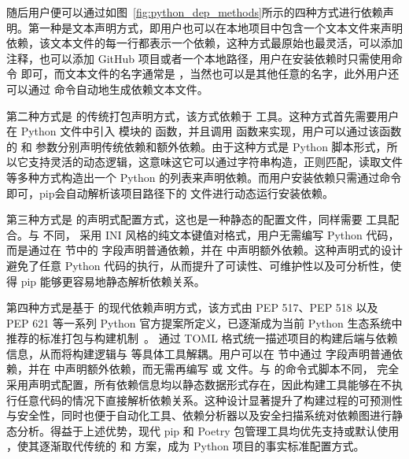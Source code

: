随后用户便可以通过如图~\ref{fig:python_dep_methods}所示的四种方式进行依赖声明。第一种是文本声明方式，即用户也可以在本地项目中包含一个文本文件来声明依赖，该文本文件的每一行都表示一个依赖，这种方式最原始也最灵活，可以添加注释，也可以添加 GitHub 项目或者一个本地路径，用户在安装依赖时只需使用命令  即可，而文本文件的名字通常是 ，当然也可以是其他任意的名字，此外用户还可以通过  命令自动地生成依赖文本文件。

第二种方式是  的传统打包声明方式，该方式依赖于  工具。这种方式首先需要用户在 Python 文件中引入  模块的  函数，并且调用  函数来实现，用户可以通过该函数的  和  参数分别声明传统依赖和额外依赖。由于这种方式是 Python 脚本形式，所以它支持灵活的动态逻辑，这意味这它可以通过字符串构造，正则匹配，读取文件等多种方式构造出一个 Python 的列表来声明依赖。而用户安装依赖只需通过命令  即可，pip会自动解析该项目路径下的  文件进行动态运行安装依赖。

第三种方式是  的声明式配置方式，这也是一种静态的配置文件，同样需要  工具配合。与  不同， 采用 INI 风格的纯文本键值对格式，用户无需编写 Python 代码，而是通过在 \code{[options]} 节中的  字段声明普通依赖，并在  中声明额外依赖。这种声明式的设计避免了任意 Python 代码的执行，从而提升了可读性、可维护性以及可分析性，使得 pip 能够更容易地静态解析依赖关系。

第四种方式是基于  的现代依赖声明方式，该方式由 PEP 517、PEP 518 以及 PEP 621 等一系列 Python 官方提案所定义，已逐渐成为当前 Python 生态系统中推荐的标准打包与构建机制~\cite{pep517,pep518,pep621}。 通过 TOML 格式统一描述项目的构建后端与依赖信息，从而将构建逻辑与  等具体工具解耦。用户可以在 \code{[project]} 节中通过  字段声明普通依赖，并在  中声明额外依赖，而无需再编写  或  文件。与  的命令式脚本不同， 完全采用声明式配置，所有依赖信息均以静态数据形式存在，因此构建工具能够在不执行任意代码的情况下直接解析依赖关系。这种设计显著提升了构建过程的可预测性与安全性，同时也便于自动化工具、依赖分析器以及安全扫描系统对依赖图进行静态分析。得益于上述优势，现代 pip 和 Poetry 包管理工具均优先支持或默认使用 ，使其逐渐取代传统的  和  方案，成为 Python 项目的事实标准配置方式。

